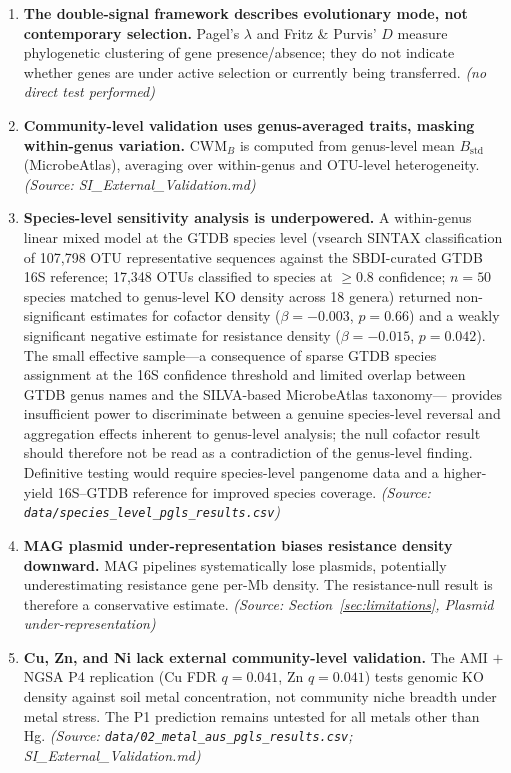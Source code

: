 \documentclass[times]{zHenriquesLab-StyleBioRxiv}
\begin{document}
\begin{enumerate}
\item \textbf{The double-signal framework describes evolutionary mode, not contemporary selection.}
Pagel's $\lambda$ and Fritz \& Purvis' $D$ measure phylogenetic clustering of
gene presence/absence; they do not indicate whether genes are under active selection
or currently being transferred. \textit{(no direct test performed)}

\item \textbf{Community-level validation uses genus-averaged traits, masking within-genus variation.}
CWM$_B$ is computed from genus-level mean $B_\text{std}$ (MicrobeAtlas), averaging
over within-genus and OTU-level heterogeneity.
\textit{(Source: SI\_External\_Validation.md)}

\item \textbf{Species-level sensitivity analysis is underpowered.}
A within-genus linear mixed model at the GTDB species level (vsearch SINTAX
classification of 107{,}798 OTU representative sequences against the SBDI-curated
GTDB 16S reference; 17{,}348 OTUs classified to species at $\ge 0.8$ confidence;
$n = 50$ species matched to genus-level KO density across 18 genera) returned
non-significant estimates for cofactor density ($\beta = -0.003$, $p = 0.66$)
and a weakly significant negative estimate for resistance density
($\beta = -0.015$, $p = 0.042$). The small effective sample---a consequence
of sparse GTDB species assignment at the 16S confidence threshold and limited
overlap between GTDB genus names and the SILVA-based MicrobeAtlas taxonomy---
provides insufficient power to discriminate between a genuine species-level
reversal and aggregation effects inherent to genus-level analysis; the null
cofactor result should therefore not be read as a contradiction of the
genus-level finding. Definitive testing would require species-level pangenome
data and a higher-yield 16S--GTDB reference for improved species coverage.
\textit{(Source: \texttt{data/species\_level\_pgls\_results.csv})}

\item \textbf{MAG plasmid under-representation biases resistance density downward.}
MAG pipelines systematically lose plasmids, potentially underestimating resistance
gene per-Mb density. The resistance-null result is therefore a conservative estimate.
\textit{(Source: Section~\ref{sec:limitations}, Plasmid under-representation)}

\item \textbf{Cu, Zn, and Ni lack external community-level validation.}
The AMI $+$ NGSA P4 replication (Cu FDR $q = 0.041$, Zn $q = 0.041$)
tests genomic KO density against soil metal concentration, not community niche breadth
under metal stress. The P1 prediction remains untested for all metals other than Hg.
\textit{(Source: \texttt{data/02\_metal\_aus\_pgls\_results.csv}; SI\_External\_Validation.md)}
\end{enumerate}
\end{document}

